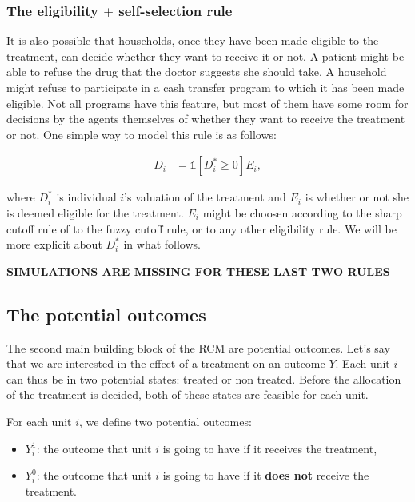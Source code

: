 \documentclass[]{book}
\providecommand{\tightlist}{%
  \setlength{\itemsep}{0pt}\setlength{\parskip}{0pt}}
\newcommand{\uns}[1]{\mathds{1}[ #1 ]}
\theoremstyle{definition}
\theoremstyle{definition}
\theoremstyle{definition}
\theoremstyle{remark}
\let\BeginKnitrBlock\begin \let\EndKnitrBlock\end
\begin{document}
\subsubsection{\texorpdfstring{The eligibility \(+\) self-selection
rule}{The eligibility + self-selection rule}}\label{the-eligibility-self-selection-rule}

It is also possible that households, once they have been made eligible
to the treatment, can decide whether they want to receive it or not. A
patient might be able to refuse the drug that the doctor suggests she
should take. A household might refuse to participate in a cash transfer
program to which it has been made eligible. Not all programs have this
feature, but most of them have some room for decisions by the agents
themselves of whether they want to receive the treatment or not. One
simple way to model this rule is as follows:

\begin{align}\label{eq:eligself}
  D_i & = \uns{D^*_i\geq0}E_i,
\end{align}

where \(D^*_i\) is individual \(i\)'s valuation of the treatment and
\(E_i\) is whether or not she is deemed eligible for the treatment.
\(E_i\) might be choosen according to the sharp cutoff rule of to the
fuzzy cutoff rule, or to any other eligibility rule. We will be more
explicit about \(D_i^*\) in what follows.

\textbf{SIMULATIONS ARE MISSING FOR THESE LAST TWO RULES}

\subsection{The potential outcomes}\label{the-potential-outcomes}

The second main building block of the RCM are potential outcomes. Let's
say that we are interested in the effect of a treatment on an outcome
\(Y\). Each unit \(i\) can thus be in two potential states: treated or
non treated. Before the allocation of the treatment is decided, both of
these states are feasible for each unit.

\BeginKnitrBlock{definition}[Potential outcomes]
\protect\hypertarget{def:unnamed-chunk-2}{}{\label{def:unnamed-chunk-2}
\iffalse (Potential outcomes) \fi{} }For each unit \(i\), we define two
potential outcomes:
\EndKnitrBlock{definition}

\begin{itemize}
\tightlist
\item
  \(Y_i^1\): the outcome that unit \(i\) is going to have if it receives
  the treatment,
\item
  \(Y_i^0\): the outcome that unit \(i\) is going to have if it
  \textbf{does not} receive the treatment.
\end{itemize}
\end{document}
